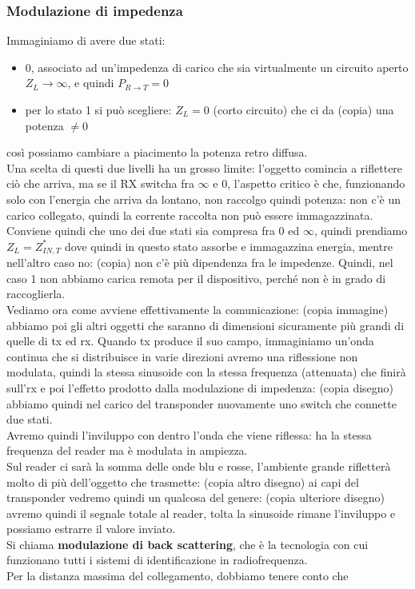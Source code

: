 \documentclass[oneside, 12pt]{extbook}
\begin{document}
\subsubsection{Modulazione di impedenza}
Immaginiamo di avere due stati:
\begin{itemize}
	\item 0, associato ad un'impedenza di carico che sia virtualmente un circuito aperto $Z_L \rightarrow \infty$, e quindi $P_{R \rightarrow T} = 0$
	\item per lo stato 1 si può scegliere: $Z_L = 0$ (corto circuito) che ci da (copia) una potenza $\neq 0$
\end{itemize}
così possiamo cambiare a piacimento la potenza retro diffusa.\\Una scelta di questi due livelli ha un grosso limite: l'oggetto comincia a riflettere ciò che arriva, ma se il RX switcha fra $\infty$ e 0, l'aspetto critico è che, funzionando solo con l'energia che arriva da lontano, non raccolgo quindi potenza: non c'è un carico collegato, quindi la corrente raccolta non può essere immagazzinata.\\Conviene quindi che uno dei due stati sia compresa fra $0$ ed $\infty$, quindi prendiamo $Z_L = Z_{IN,T}^*$ dove quindi in questo stato assorbe e immagazzina energia, mentre nell'altro caso no: (copia) non c'è più dipendenza fra le impedenze. Quindi, nel caso 1 non abbiamo carica remota per il dispositivo, perché non è in grado di raccoglierla.\\Vediamo ora come avviene effettivamente la comunicazione: (copia immagine) abbiamo poi gli altri oggetti che saranno di dimensioni sicuramente più grandi di quelle di tx ed rx. Quando tx produce il suo campo, immaginiamo un'onda continua che si distribuisce in varie direzioni avremo una riflessione non modulata, quindi la stessa sinusoide con la stessa frequenza (attenuata) che finirà sull'rx e poi l'effetto prodotto dalla modulazione di impedenza: (copia disegno) abbiamo quindi nel carico del transponder nuovamente uno switch che connette due stati.\\Avremo quindi l'inviluppo con dentro l'onda che viene riflessa: ha la stessa frequenza del reader ma è modulata in ampiezza.\\Sul reader ci sarà la somma delle onde blu e rosse, l'ambiente grande rifletterà molto di più dell'oggetto che trasmette: (copia altro disegno) ai capi del transponder vedremo quindi un qualcosa del genere: (copia ulteriore disegno) avremo quindi il segnale totale al reader, tolta la sinusoide rimane l'inviluppo e possiamo estrarre il valore inviato.\\Si chiama \textbf{modulazione di back scattering}, che è la tecnologia con cui funzionano tutti i sistemi di identificazione in radiofrequenza.\\Per la distanza massima del collegamento, dobbiamo tenere conto che 
\end{document}
